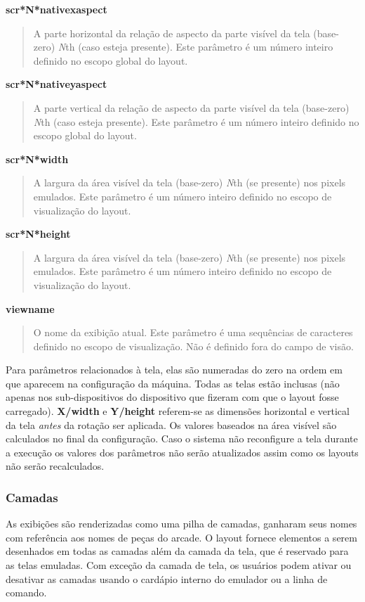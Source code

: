 \documentclass[letterpaper,10pt,brazil]{sphinxmanual}
\begin{document}
\textbf{scr*N*nativexaspect}
\begin{quote}

A parte horizontal da relação de aspecto da parte visível da tela
(base-zero) \emph{N}th (caso esteja presente). Este parâmetro é um
número inteiro definido no escopo global do layout.
\end{quote}

\textbf{scr*N*nativeyaspect}
\begin{quote}

A parte vertical da relação de aspecto da parte visível da tela
(base-zero) \emph{N}th (caso esteja presente). Este parâmetro é um
número inteiro definido no escopo global do layout.
\end{quote}

\textbf{scr*N*width}
\begin{quote}

A largura da área visível da tela (base-zero) \emph{N}th (se presente)
nos pixels emulados. Este parâmetro é um número inteiro definido no
escopo de visualização do layout.
\end{quote}

\textbf{scr*N*height}
\begin{quote}

A largura da área visível da tela (base-zero) \emph{N}th (se presente)
nos pixels emulados. Este parâmetro é um número inteiro definido no
escopo de visualização do layout.
\end{quote}

\textbf{viewname}
\begin{quote}

O nome da exibição atual. Este parâmetro é uma sequências de
caracteres definido no escopo de visualização.
Não é definido fora do campo de visão.
\end{quote}

Para parâmetros relacionados à tela, elas são numeradas do zero na
ordem em que aparecem na configuração da máquina. Todas as telas estão
inclusas (não apenas nos sub-dispositivos do dispositivo que fizeram com
que o layout fosse carregado). \textbf{X/width} e \textbf{Y/height} referem-se as
dimensões horizontal e vertical da tela \emph{antes} da rotação ser aplicada.
Os valores baseados na área visível são calculados no final da
configuração. Caso o sistema não reconfigure a tela durante a execução
os valores dos parâmetros não serão atualizados assim como os layouts
não serão recalculados.


\subsubsection{Camadas}
\label{techspecs/layout_files:layout-concepts-layers}\label{techspecs/layout_files:camadas}
As exibições são renderizadas como uma pilha de camadas, ganharam
seus nomes com referência aos nomes de peças do arcade.
O layout fornece elementos a serem desenhados em todas as camadas além
da camada da tela, que é reservado para as telas emuladas. Com exceção
da camada de tela, os usuários podem ativar ou desativar as camadas
usando o cardápio interno do emulador ou a linha de comando.
\end{document}
